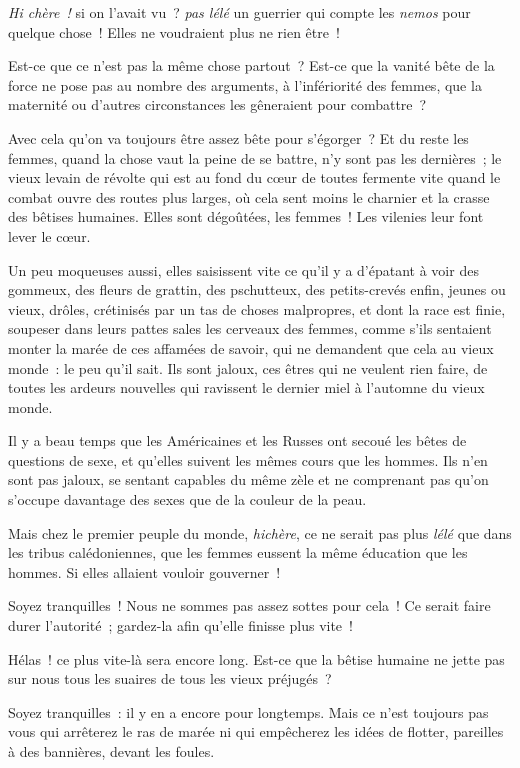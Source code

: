\documentclass[french,twoside]{book} %
\begin{document}
\emph{Hi chère !} si on l’avait vu ? \emph{pas lélé} un guerrier qui compte les \emph{nemos} pour quelque chose ! Elles ne voudraient plus ne rien être !\par
Est-ce que ce n’est pas la même chose partout ? Est-ce que la vanité bête de la force ne pose pas au nombre des arguments, à l’infériorité des femmes, que la maternité ou d’autres circonstances les gêneraient pour combattre ?\par
 Avec cela qu’on va toujours être assez bête pour s’égorger ? Et du reste les femmes, quand la chose vaut la peine de se battre, n’y sont pas les dernières ; le vieux levain de révolte qui est au fond du cœur de toutes fermente vite quand le combat ouvre des routes plus larges, où cela sent moins le charnier et la crasse des bêtises humaines. Elles sont dégoûtées, les femmes ! Les vilenies leur font lever le cœur.\par
Un peu moqueuses aussi, elles saisissent vite ce qu’il y a d’épatant à voir des gommeux, des fleurs de grattin, des pschutteux, des petits-crevés enfin, jeunes ou vieux, drôles, crétinisés par un tas de choses malpropres, et dont la race est finie, soupeser dans leurs pattes sales les cerveaux des femmes, comme s’ils sentaient monter la marée de ces affamées de savoir, qui ne demandent que cela au vieux monde : le peu qu’il sait. Ils sont jaloux, ces êtres qui ne veulent rien faire, de toutes les ardeurs nouvelles qui ravissent le dernier miel à l’automne du vieux monde.\par
Il y a beau temps que les Américaines et les Russes ont secoué les bêtes de questions de sexe, et qu’elles suivent les mêmes cours que les hommes. Ils n’en sont pas jaloux, se sentant capables du même zèle et ne comprenant pas  qu’on s’occupe davantage des sexes que de la couleur de la peau.\par
Mais chez le premier peuple du monde, \emph{hichère}, ce ne serait pas plus \emph{lélé} que dans les tribus calédoniennes, que les femmes eussent la même éducation que les hommes. Si elles allaient vouloir gouverner !\par
Soyez tranquilles ! Nous ne sommes pas assez sottes pour cela ! Ce serait faire durer l’autorité ; gardez-la afin qu’elle finisse plus vite !\par
Hélas ! ce plus vite-là sera encore long. Est-ce que la bêtise humaine ne jette pas sur nous tous les suaires de tous les vieux préjugés ?\par
Soyez tranquilles : il y en a encore pour longtemps. Mais ce n’est toujours pas vous qui arrêterez le ras de marée ni qui empêcherez les idées de flotter, pareilles à des bannières, devant les foules.\par
\end{document}
